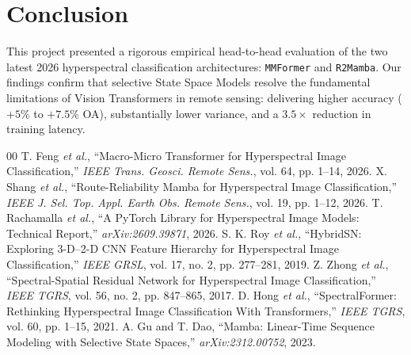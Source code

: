 \documentclass[conference]{IEEEtran}
\begin{document}
\section{Conclusion}
This project presented a rigorous empirical head-to-head evaluation of the two latest 2026 hyperspectral classification architectures: \texttt{MMFormer} and \texttt{R2Mamba}. Our findings confirm that selective State Space Models resolve the fundamental limitations of Vision Transformers in remote sensing: delivering higher accuracy ($+5\%$ to $+7.5\%$ OA), substantially lower variance, and a $3.5\times$ reduction in training latency.

\begin{thebibliography}{00}
 T. Feng \textit{et al.}, ``Macro-Micro Transformer for Hyperspectral Image Classification,'' \textit{IEEE Trans. Geosci. Remote Sens.}, vol. 64, pp. 1--14, 2026.
 X. Shang \textit{et al.}, ``Route-Reliability Mamba for Hyperspectral Image Classification,'' \textit{IEEE J. Sel. Top. Appl. Earth Obs. Remote Sens.}, vol. 19, pp. 1--12, 2026.
 T. Rachamalla \textit{et al.}, ``A PyTorch Library for Hyperspectral Image Models: Technical Report,'' \textit{arXiv:2609.39871}, 2026.
 S. K. Roy \textit{et al.}, ``HybridSN: Exploring 3-D--2-D CNN Feature Hierarchy for Hyperspectral Image Classification,'' \textit{IEEE GRSL}, vol. 17, no. 2, pp. 277--281, 2019.
 Z. Zhong \textit{et al.}, ``Spectral-Spatial Residual Network for Hyperspectral Image Classification,'' \textit{IEEE TGRS}, vol. 56, no. 2, pp. 847--865, 2017.
 D. Hong \textit{et al.}, ``SpectralFormer: Rethinking Hyperspectral Image Classification With Transformers,'' \textit{IEEE TGRS}, vol. 60, pp. 1--15, 2021.
 A. Gu and T. Dao, ``Mamba: Linear-Time Sequence Modeling with Selective State Spaces,'' \textit{arXiv:2312.00752}, 2023.
\end{thebibliography}
\end{document}
